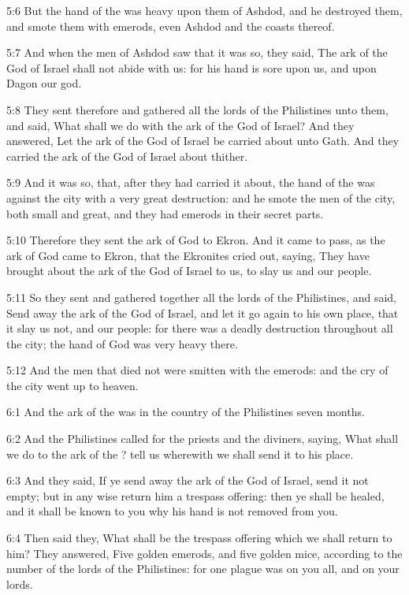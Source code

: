 5:6 But the hand of the \LORD was heavy upon them of Ashdod, and he
destroyed them, and smote them with emerods, even Ashdod and the
coasts thereof.

5:7 And when the men of Ashdod saw that it was so, they said, The ark
of the God of Israel shall not abide with us: for his hand is sore
upon us, and upon Dagon our god.

5:8 They sent therefore and gathered all the lords of the Philistines
unto them, and said, What shall we do with the ark of the God of
Israel? And they answered, Let the ark of the God of Israel be carried
about unto Gath. And they carried the ark of the God of Israel about
thither.

5:9 And it was so, that, after they had carried it about, the hand of
the \LORD was against the city with a very great destruction: and he
smote the men of the city, both small and great, and they had emerods
in their secret parts.

5:10 Therefore they sent the ark of God to Ekron. And it came to pass,
as the ark of God came to Ekron, that the Ekronites cried out, saying,
They have brought about the ark of the God of Israel to us, to slay us
and our people.

5:11 So they sent and gathered together all the lords of the
Philistines, and said, Send away the ark of the God of Israel, and let
it go again to his own place, that it slay us not, and our people: for
there was a deadly destruction throughout all the city; the hand of
God was very heavy there.

5:12 And the men that died not were smitten with the emerods: and the
cry of the city went up to heaven.

6:1 And the ark of the \LORD was in the country of the Philistines
seven months.

6:2 And the Philistines called for the priests and the diviners,
saying, What shall we do to the ark of the \LORD? tell us wherewith we
shall send it to his place.

6:3 And they said, If ye send away the ark of the God of Israel, send
it not empty; but in any wise return him a trespass offering: then ye
shall be healed, and it shall be known to you why his hand is not
removed from you.

6:4 Then said they, What shall be the trespass offering which we shall
return to him? They answered, Five golden emerods, and five golden
mice, according to the number of the lords of the Philistines: for one
plague was on you all, and on your lords.

